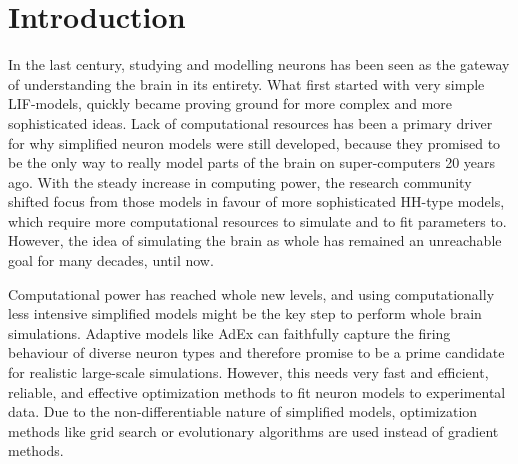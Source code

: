 \chapter{Introduction}
\label{ch:introduction}

In the last century, studying and modelling neurons has been seen as the gateway of understanding the brain in its entirety.
What first started with very simple \gls{LIF}-models, quickly became proving ground for more complex and more sophisticated ideas.
Lack of computational resources has been a primary driver for why simplified neuron models were still developed, because they promised to be the only way to really model parts of the brain on super-computers 20 years ago.
With the steady increase in computing power, the research community shifted focus from those models in favour of more sophisticated \gls{HH}-type models, which require more computational resources to simulate and to fit parameters to.
However, the idea of simulating the brain as whole has remained an unreachable goal for many decades, until now.

Computational power has reached whole new levels, and using computationally less intensive simplified models might be the key step to perform whole brain simulations.
Adaptive models like \gls{AdEx} can faithfully capture the firing behaviour of diverse neuron types and therefore promise to be a prime candidate for realistic large-scale simulations.
However, this needs very fast and efficient, reliable, and effective optimization methods to fit neuron models to experimental data.
Due to the non-differentiable nature of simplified models, optimization methods like grid search or evolutionary algorithms are used instead of gradient methods.

